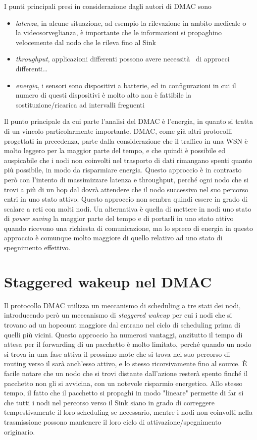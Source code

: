 \documentclass[pdftex,12pt,a4paper,italian,openany]{book}
\begin{document}
I punti principali presi in considerazione dagli autori di DMAC sono
\begin{itemize}

\item \emph{latenza}, in alcune situazione, ad esempio la rilevazione in ambito medicale o 
la videosorveglianza, è importante che le informazioni si propaghino velocemente dal nodo che le 
rileva fino al Sink
\item \emph{throughput}, applicazioni differenti possono avere necessità  di approcci differenti\ldots

\item \emph{energia}, i sensori sono dispositivi a batterie, ed in configurazioni in cui il 
numero di questi dispositivi è molto alto non è fattibile la sostituzione/ricarica ad 
intervalli freguenti

\end{itemize}

Il punto principale da cui parte l'analisi del DMAC è l'energia, in quanto si tratta di un 
vincolo particolarmente importante. DMAC, come già altri protocolli\cite{SMAC}\cite{TMAC} 
progettati in precedenza, parte dalla 
considerazione che il traffico in una WSN è molto leggero per la maggior parte del tempo, e 
che quindi è 
possibile ed auspicabile che i nodi non coinvolti nel trasporto di dati rimangano spenti quanto più possibile, in modo da risparmiare energia. 
Questo approccio è in contrasto però con l'intento di massimizzare latenza e throughput, 
perché ogni nodo che si trovi a più di un hop dal \sink dovrà attendere che il nodo successivo 
nel suo percorso entri in uno stato attivo. Questo approccio non sembra quindi essere in grado 
di scalare a reti con molti nodi. 
Un alternativa è quella di mettere in nodi uno stato di \emph{power saving} la 
maggior parte del tempo e di portarli in uno stato attivo quando ricevono una richiesta di 
comunicazione, ma lo spreco di energia in questo approccio è comunque molto maggiore di quello 
relativo ad uno stato di spegnimento effettivo. 
\section{Staggered wakeup nel DMAC}
Il protocollo DMAC utilizza un meccanismo di scheduling a tre stati dei nodi, 
introducendo però un meccanismo di \emph{staggered wakeup} per cui i nodi che si trovano ad un 
hopcount maggiore dal \sink entrano nel ciclo di scheduling prima di quelli più vicini.
Questo approccio ha numerosi vantaggi, anzitutto il tempo di attesa per il forwarding di un
pacchetto è molto limitato, perché quando un nodo si trova in una fase attiva il prossimo mote 
che si trova nel suo percorso di routing verso il \sink sarà anch'esso attivo, e lo stesso 
ricorsivamente fino al source. 
\`E facile notare che un nodo che si trovi distante dall'azione resterà spento finché il 
pacchetto non gli si avvicina, con un notevole risparmio energetico.
Allo stesso tempo, il fatto che il pacchetto si propaghi in modo "lineare" permette di far si 
che tutti i nodi nel percorso verso il Sink siano in grado di correggere tempestivamente il loro 
scheduling se necessario, mentre i nodi non coinvolti nella trasmissione possono mantenere il 
loro ciclo di attivazione/spegnimento originario. 
\end{document}
